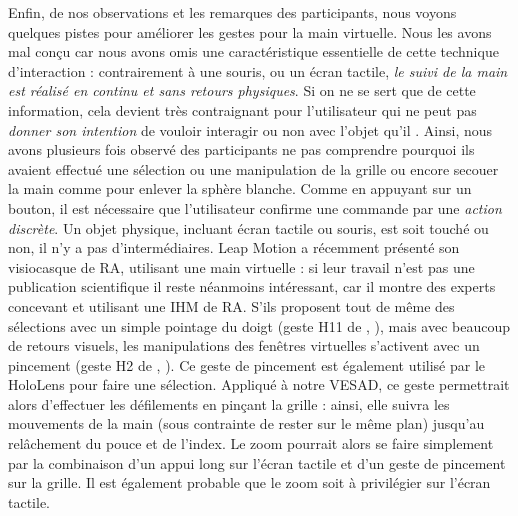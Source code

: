 Enfin, de nos observations et les remarques des participants, nous voyons quelques pistes pour améliorer les gestes pour la main virtuelle. Nous les avons mal conçu car nous avons omis une caractéristique essentielle de cette technique d'interaction : contrairement à une souris, ou un écran tactile, \emph{le suivi de la main est réalisé en continu et sans retours physiques}. Si on ne se sert que de cette information, cela devient très contraignant pour l'utilisateur qui ne peut pas \emph{donner son intention} de vouloir interagir ou non avec l'objet qu'il . Ainsi, nous avons plusieurs fois observé des participants ne pas comprendre pourquoi ils avaient effectué une sélection ou une manipulation de la grille ou encore secouer la main comme pour enlever la sphère blanche. Comme en appuyant sur un bouton, il est nécessaire que l'utilisateur confirme une commande par une \emph{action discrète}. Un objet physique, incluant écran tactile ou souris, est soit touché ou non, il n'y a pas d'intermédiaires. Leap Motion a récemment présenté son visiocasque de RA, utilisant une main virtuelle : si leur travail n'est pas une publication scientifique il reste néanmoins intéressant, car il montre des experts concevant et utilisant une IHM de RA. S'ils proposent tout de même des sélections avec un simple pointage du doigt (geste H11 de \cite{Piumsomboon2013}, ), mais avec beaucoup de retours visuels, les manipulations des fenêtres virtuelles s'activent avec un pincement (geste H2 de \cite{Piumsomboon2013}, ). Ce geste de pincement est également utilisé par le HoloLens pour faire une sélection. Appliqué à notre VESAD, ce geste permettrait alors d'effectuer les défilements en pinçant la grille : ainsi, elle suivra les mouvements de la main (sous contrainte de rester sur le même plan) jusqu'au relâchement du pouce et de l'index. Le zoom pourrait alors se faire simplement par la combinaison d'un appui long sur l'écran tactile et d'un geste de pincement sur la grille. Il est également probable que le zoom soit à privilégier sur l'écran tactile.


